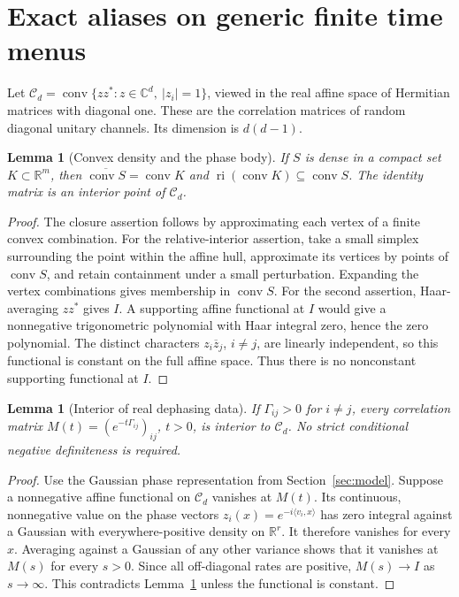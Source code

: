 \documentclass[11pt,a4paper]{article}
\newtheorem{lemma}[theorem]{Lemma}
\theoremstyle{remark}\newtheorem{remark}[theorem]{Remark}
\newcommand{\R}{\mathbb R}\newcommand{\C}{\mathbb C}
\newcommand{\conv}{\operatorname{conv}}
\begin{document}
\section{Exact aliases on generic finite time menus}\label{sec:alias}
Let $\mathcal C_d=\conv\{zz^*:z\in\C^d,\ |z_i|=1\}$, viewed in
the real affine space of Hermitian matrices with diagonal one. These are
the correlation matrices of random diagonal unitary channels. Its
dimension is $d(d-1)$.

\begin{lemma}[Convex density and the phase body]\label{lem:convex}
If $S$ is dense in a compact set $K\subset\R^m$, then
$\overline{\conv S}=\conv K$ and
$\operatorname{ri}(\conv K)\subseteq\conv S$.
The identity matrix is an interior point of $\mathcal C_d$.
\end{lemma}
\begin{proof}
The closure assertion follows by approximating each vertex of a finite
convex combination. For the relative-interior assertion, take a small
simplex surrounding the point within the affine hull, approximate its
vertices by points of $\conv S$, and retain containment under a small
perturbation. Expanding the vertex combinations gives membership in
$\conv S$.
For the second assertion, Haar-averaging $zz^*$ gives $I$. A supporting
affine functional at $I$ would give a nonnegative trigonometric polynomial
with Haar integral zero, hence the zero polynomial. The distinct
characters $z_i\overline z_j$, $i\ne j$, are linearly independent,
so this functional is constant on the full affine space. Thus there is
no nonconstant supporting functional at $I$.
\end{proof}

\begin{lemma}[Interior of real dephasing data]\label{lem:interior}
If $\Gamma_{ij}>0$ for $i\ne j$, every correlation matrix
$M(t)=(e^{-t\Gamma_{ij}})_{ij}$, $t>0$, is interior to $\mathcal C_d$.
No strict conditional negative definiteness is required.
\end{lemma}
\begin{proof}
Use the Gaussian phase representation from Section~\ref{sec:model}.
Suppose a nonnegative affine functional on $\mathcal C_d$ vanishes at
$M(t)$. Its continuous, nonnegative value on the phase vectors
$z_i(x)=e^{-i\langle v_i,x\rangle}$ has zero integral against a Gaussian
with everywhere-positive density on $\R^r$. It therefore vanishes for
every $x$. Averaging against a Gaussian of any other variance shows that
it vanishes at $M(s)$ for every $s>0$. Since all off-diagonal rates are
positive, $M(s)\to I$ as $s\to\infty$. This contradicts
Lemma~\ref{lem:convex} unless the functional is constant.
\end{proof}
\end{document}
